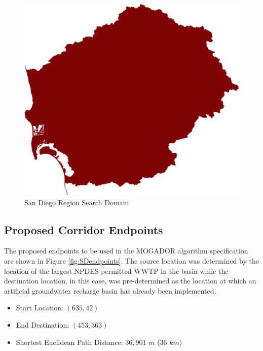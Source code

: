        \begin{figure}[!h]
            \begin{center}
            \includegraphics[width=5.5in]{figures/SanDiego_SearchDomain.png}   
            \caption{San Diego Region Search Domain}
            \label{fig:SDdomain}
            \end{center}
        \end{figure}

    \subsection{Proposed Corridor Endpoints}
    
The proposed endpoints to be used in the MOGADOR algorithm specification are shown in Figure \ref{fig:SDendpoints}. The source location was determined by the location of the largest NPDES permitted WWTP in the basin while the destination location, in this case, was pre-determined as the location at which an artificial groundwater recharge basin has already been implemented.
    
    \begin{itemize}
      \setlength{\itemsep}{0cm}
      \setlength{\parskip}{0cm}
        \item Start Location: $(635,42)$
        \item End Destination: $(453,363)$    
        \item Shortest Euclidean Path Distance: $36,901$ $m$ ($36$ $km$)
    \end{itemize}
    
